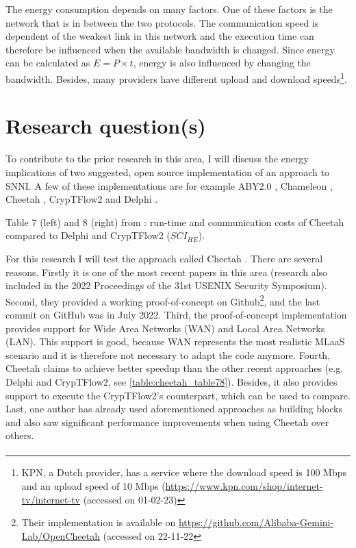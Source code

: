 \documentclass[../thesis.tex]{subfiles}
\begin{document}
The energy consumption depends on many factors. One of these factors is the network that is in between the two protocols. The communication speed is dependent of the weakest link in this network and the execution time can therefore be influenced when the available bandwidth is changed. Since energy can be calculated as $E=P\times t$, energy is also influenced by changing the bandwidth. Besides, many providers have different upload and download speeds\footnote{KPN, a Dutch provider, has a service where the download speed is 100 Mbps and an upload speed of 10 Mbps (\url{https://www.kpn.com/shop/internet-tv/internet-tv} (accessed on 01-02-23)\label{fnote:providers}}. 

\section{Research question(s)}
To contribute to the prior research in this area, I will discuss the energy implications of two suggested, open source implementation of an approach to SNNI. A few of these implementations are for example ABY2.0 \parencite{aby20}, Chameleon \parencite{chameleon}, Cheetah \parencite{cheetah}, CrypTFlow2 \parencite{cryptflow2} and Delphi \parencite{delphi}. 

\begin{table}
    \begin{adjustbox}{width=\columnwidth,center}
        
        \quad
        
    \end{adjustbox}
    \caption{Table 7 (left) and 8 (right) from \parencite[p. 821]{cheetah}: run-time and communication costs of Cheetah compared to Delphi and CrypTFlow2 (\textit{${SCI}_{HE}$}).}
    \label{table:cheetah_table78}
\end{table}

For this research I will test the approach called Cheetah \parencite{cheetah}. There are several reasons. Firstly it is one of the most recent papers in this area (research also included in the 2022 Proceedings of the 31st USENIX Security Symposium). Second, they provided a working proof-of-concept on Github\footnote{Their implementation is available on \url{https://github.com/Alibaba-Gemini-Lab/OpenCheetah} (accessed on 22-11-22}, and the last commit on GitHub was in July 2022. Third, the proof-of-concept implementation provides support for Wide Area Networks (WAN) and Local Area Networks (LAN). This support is good, because WAN represents the most realistic MLaaS scenario \parencite{ribeiro2015mlaasml} and it is therefore not necessary to adapt the code anymore. Fourth, Cheetah claims to achieve better speedup than the other recent approaches (e.g. Delphi and CrypTFlow2, see \autoref{table:cheetah_table78}). Besides, it also provides support to execute the CrypTFlow2's counterpart, which can be used to compare. Last, one author \parencite{dong2022} has already used aforementioned approaches as building blocks and also saw significant performance improvements when using Cheetah over others. \paragraph{}
\end{document}
